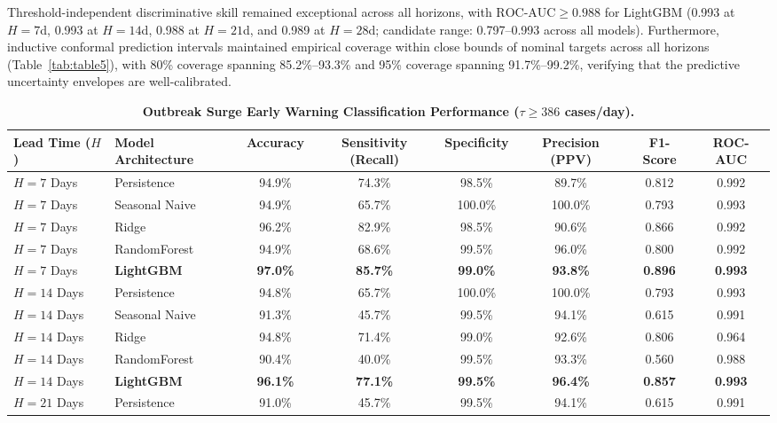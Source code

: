 \documentclass[11pt,a4paper]{article}
\begin{document}
Threshold-independent discriminative skill remained exceptional across all horizons, with $\text{ROC-AUC} \ge 0.988$ for LightGBM (0.993 at $H=7$d, 0.993 at $H=14$d, 0.988 at $H=21$d, and 0.989 at $H=28$d; candidate range: 0.797--0.993 across all models). Furthermore, inductive conformal prediction intervals maintained empirical coverage within close bounds of nominal targets across all horizons (Table~\ref{tab:table5}), with 80\% coverage spanning 85.2\%--93.3\% and 95\% coverage spanning 91.7\%--99.2\%, verifying that the predictive uncertainty envelopes are well-calibrated.

\begin{table}[t]
\centering
\small
\caption{\textbf{Outbreak Surge Early Warning Classification Performance ($\tau \ge 386$ cases/day).}}
\label{tab:table4}
\begin{tabular*}{\textwidth}{@{\extracolsep{\fill}}llcccccc@{}}
\toprule
\textbf{Lead Time ($H$)} & \textbf{Model Architecture} & \textbf{Accuracy} & \textbf{Sensitivity (Recall)} & \textbf{Specificity} & \textbf{Precision (PPV)} & \textbf{F1-Score} & \textbf{ROC-AUC} \\
\midrule
$H=7$ Days & Persistence & 94.9\% & 74.3\% & 98.5\% & 89.7\% & 0.812 & 0.992 \\
$H=7$ Days & Seasonal Naive & 94.9\% & 65.7\% & 100.0\% & 100.0\% & 0.793 & 0.993 \\
$H=7$ Days & Ridge & 96.2\% & 82.9\% & 98.5\% & 90.6\% & 0.866 & 0.992 \\
$H=7$ Days & RandomForest & 94.9\% & 68.6\% & 99.5\% & 96.0\% & 0.800 & 0.992 \\
$H=7$ Days & \textbf{LightGBM} & \textbf{97.0\%} & \textbf{85.7\%} & \textbf{99.0\%} & \textbf{93.8\%} & \textbf{0.896} & \textbf{0.993} \\
\midrule
$H=14$ Days & Persistence & 94.8\% & 65.7\% & 100.0\% & 100.0\% & 0.793 & 0.993 \\
$H=14$ Days & Seasonal Naive & 91.3\% & 45.7\% & 99.5\% & 94.1\% & 0.615 & 0.991 \\
$H=14$ Days & Ridge & 94.8\% & 71.4\% & 99.0\% & 92.6\% & 0.806 & 0.964 \\
$H=14$ Days & RandomForest & 90.4\% & 40.0\% & 99.5\% & 93.3\% & 0.560 & 0.988 \\
$H=14$ Days & \textbf{LightGBM} & \textbf{96.1\%} & \textbf{77.1\%} & \textbf{99.5\%} & \textbf{96.4\%} & \textbf{0.857} & \textbf{0.993} \\
\midrule
$H=21$ Days & Persistence & 91.0\% & 45.7\% & 99.5\% & 94.1\% & 0.615 & 0.991 \\

\end{tabular*}
\end{table}
\end{document}

